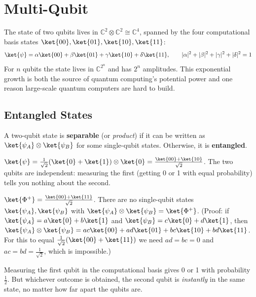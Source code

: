 \documentclass[oneside]{academica}
\begin{document}
\section{Multi-Qubit}

The state of two qubits lives in $\mathbb{C}^2\otimes\mathbb{C}^2\cong\mathbb{C}^4$, spanned by the four computational basis states $\ket{00},\ket{01},\ket{10},\ket{11}$:
\begin{equation*}
  \ket{\psi}=\alpha\ket{00}+\beta\ket{01}+\gamma\ket{10}+\delta\ket{11},\qquad |\alpha|^2+|\beta|^2+|\gamma|^2+|\delta|^2=1
\end{equation*}
For $n$ qubits the state lives in $\mathbb{C}^{2^n}$ and has $2^n$ amplitudes.
This exponential growth is both the source of quantum computing's potential power and one reason large-scale quantum computers are hard to build.

\subsection{Entangled States}

A two-qubit state is \textbf{separable} (or \emph{product}) if it can be written as $\ket{\psi_A}\otimes\ket{\psi_B}$ for some single-qubit states.
Otherwise, it is \textbf{entangled}.

\begin{example*}
  $\ket{\psi}=\frac{1}{\sqrt{2}}(\ket{0}+\ket{1})\otimes\ket{0} =\frac{\ket{00}+\ket{10}}{\sqrt{2}}$.
  The two qubits are independent: measuring the first (getting 0 or 1 with equal probability) tells you nothing about the second.
\end{example*}

\begin{example*}
  $\ket{\Phi^+}=\frac{\ket{00}+\ket{11}}{\sqrt{2}}$.
  There are no single-qubit states $\ket{\psi_A},\ket{\psi_B}$ with $\ket{\psi_A}\otimes\ket{\psi_B}=\ket{\Phi^+}$.
  (Proof: if $\ket{\psi_A}=a\ket{0}+b\ket{1}$ and $\ket{\psi_B}=c\ket{0}+d\ket{1}$, then $\ket{\psi_A}\otimes\ket{\psi_B}=ac\ket{00}+ad\ket{01}+bc\ket{10}+bd\ket{11}$.
  For this to equal $\frac{1}{\sqrt{2}}(\ket{00}+\ket{11})$ we need $ad=bc=0$ and $ac=bd=\frac{1}{\sqrt{2}}$, which is impossible.)
  
  Measuring the first qubit in the computational basis gives 0 or 1 with probability $\frac{1}{2}$.
  But whichever outcome is obtained, the second qubit is \emph{instantly} in the same state, no matter how far apart the qubits are.
\end{example*}
\end{document}
